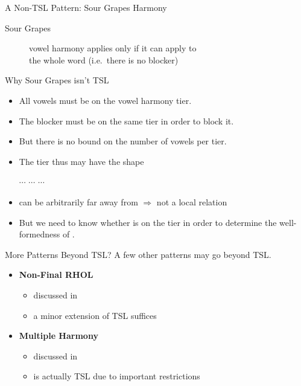 \documentclass[xcolor={usenames,svgnames,x11names,table}]{beamer}
\begin{document}
\begin{frame}{A Non-TSL Pattern: Sour Grapes Harmony}
    \begin{description}
        \item[Sour Grapes] vowel harmony applies only if it can apply to\\
                           the whole word (i.e.\ there is no blocker)
    \end{description}

    \begin{block}{Why Sour Grapes isn't TSL}
        \begin{itemize}
            \item All vowels  must be on the vowel harmony tier. 
            \item The blocker  must be on the same tier in order to block it.
            \item But there is no bound on the number of vowels per tier.
            \item The tier thus may have the shape
                \begin{center}
                    $\cdots$    $\cdots$  $\cdots$
                \end{center}
            \item {} can be arbitrarily far away from  $\Rightarrow$ not a local relation
            \item But we need to know whether  is on the tier in order to determine the well-formedness of .
        \end{itemize}
    \end{block}
\end{frame}

\begin{frame}{More Patterns Beyond TSL?}
    A few other patterns may go beyond TSL.
    \begin{itemize}
        \item \textbf{Non-Final RHOL}\\
            \begin{itemize}
                \item discussed in 
                \item a minor extension of TSL suffices
            \end{itemize}
        \item \textbf{Multiple Harmony}\\
            \begin{itemize}
                \item discussed in 
                \item is actually TSL due to important restrictions
            \end{itemize}
    \end{itemize}
\end{frame}
\end{document}
